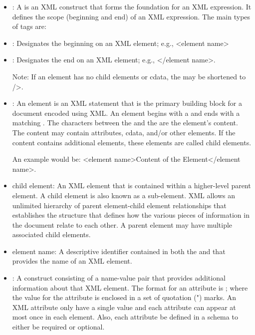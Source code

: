 \documentclass{mtconnect}	%
\begin{document}
\begin{itemize}
\item {}:  A  is an XML construct that forms the foundation for an XML expression.  It defines the scope (beginning and end) of an XML expression.  The main types of tags are: 

\item {}:  Designates the beginning on an XML element; e.g., <\gls{element name}> 

\item {}:  Designates the end on an XML element; e.g., </\gls{element name}>. 

\begin{note}
Note: If an element has no \glspl{child element} or \gls{cdata}, the  may be shortened to />.
\end{note}

\item {}:  An element is an XML statement that is the primary building block for a document encoded using XML.  An element begins with a  and ends with a matching .  The characters between the  and the  are the element's content.  The content may contain attributes, \gls{cdata}, and/or other elements.  If the content contains additional elements, these elements are called \glspl{child element}.

An example would be:  <\gls{element name}>Content of the Element</\gls{element name}>.

\item \gls{child element}:  An XML element that is contained within a higher-level \gls{parent element}.  A \gls{child element} is also known as a sub-element.  XML allows an unlimited hierarchy of \gls{parent element}-\gls{child element} relationships that establishes the structure that defines how the various pieces of information in the document relate to each other.  A \gls{parent element} may have multiple associated \glspl{child element}.

\item \gls{element name}:  A descriptive identifier contained in both the  and  that provides the name of an XML element.

\item {}:  A construct consisting of a name-value pair that provides additional information about that XML element.  The format for an attribute is ; where the value for the attribute is enclosed in a set of quotation (") marks.  An XML attribute \MUST only have a single value and each attribute can appear at most once in each element.  Also, each attribute \MUST be defined in a \gls{schema} to either be required or optional.   


\end{itemize}
\end{document}
